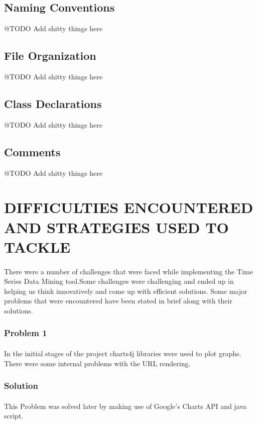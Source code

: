 \documentclass[12pt]{report}
\begin{document}
\subsection{Naming Conventions}
@TODO Add shitty things here
\subsection{File Organization}
@TODO Add shitty things here
\subsection{Class Declarations}
@TODO Add shitty things here
\subsection{Comments}
@TODO Add shitty things here
\section{DIFFICULTIES ENCOUNTERED AND STRATEGIES USED TO TACKLE}

\paragraph{}There were a number of challenges that were faced while implementing the Time Series Data Mining tool.Some challenges were challenging and ended up in helping us think innovatively and come up with efficient solutions. Some major problems that were encountered have been stated in brief along with their solutions.
\subsubsection{Problem 1}
\paragraph{}In the initial stages of the project charts4j libraries were used to plot graphs. There were some internal problems with the URL rendering.

\subsubsection{Solution}
\paragraph{}This Problem was solved later by making use of Google's Charts API and java script. 
\end{document}
